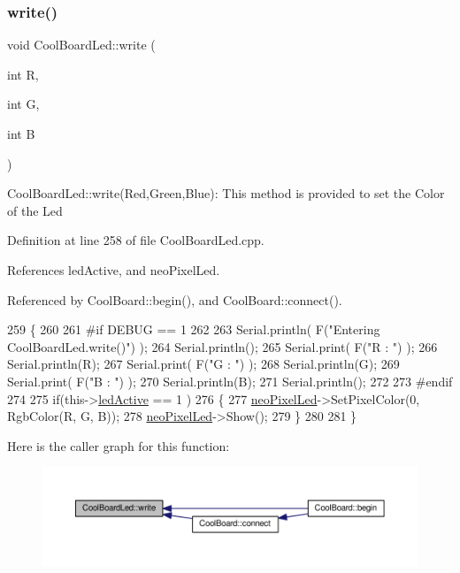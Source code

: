 \subsubsection{\texorpdfstring{write()}{write()}}
{\footnotesize\ttfamily void Cool\+Board\+Led\+::write (\begin{DoxyParamCaption}\item[{int}]{R,  }\item[{int}]{G,  }\item[{int}]{B }\end{DoxyParamCaption})}

Cool\+Board\+Led\+::write(\+Red,\+Green,\+Blue)\+: This method is provided to set the Color of the Led 

Definition at line 258 of file Cool\+Board\+Led.\+cpp.



References led\+Active, and neo\+Pixel\+Led.



Referenced by Cool\+Board\+::begin(), and Cool\+Board\+::connect().


\begin{DoxyCode}
259 \{
260 
261 \textcolor{preprocessor}{#if DEBUG == 1}
262 
263     Serial.println( F(\textcolor{stringliteral}{"Entering CoolBoardLed.write()"}) );
264     Serial.println();
265     Serial.print( F(\textcolor{stringliteral}{"R : "}) );
266     Serial.println(R);
267     Serial.print( F(\textcolor{stringliteral}{"G : "}) );
268     Serial.println(G);
269     Serial.print( F(\textcolor{stringliteral}{"B : "}) );
270     Serial.println(B);
271     Serial.println();   
272 
273 \textcolor{preprocessor}{#endif}
274 
275     \textcolor{keywordflow}{if}(this->\hyperlink{classCoolBoardLed_a5f17c135516fcf4b44ea8a096ba0177a}{ledActive} == 1 )
276     \{
277         \hyperlink{classCoolBoardLed_ac2c13fa462a010cd9242bf297c013923}{neoPixelLed}->SetPixelColor(0, RgbColor(R, G, B));
278         \hyperlink{classCoolBoardLed_ac2c13fa462a010cd9242bf297c013923}{neoPixelLed}->Show();
279     \}
280 
281 \}
\end{DoxyCode}
Here is the caller graph for this function\+:\nopagebreak
\begin{figure}[H]
\begin{center}
\leavevmode
\includegraphics[width=350pt]{classCoolBoardLed_a30fadd4cbec17ceea428bf7a32207e87_icgraph}
\end{center}
\end{figure}


